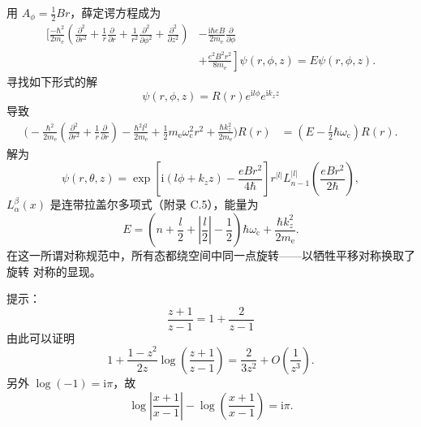  用 $A_{\phi}=\frac{1}{2}Br$，薛定谔方程成为
\begin{align*}
\Bigg[\frac{-\hbar^{2}}{2m_{\mathrm{e}}}\left(\frac{\partial^{2}}{\partial r^{2}}+\frac{1}{r}\frac{\partial}{\partial r}+\frac{1}{r^{2}}\frac{\partial^{2}}{\partial\phi^{2}}+\frac{\partial^{2}}{\partial z^{2}}\right) & - \frac{\mathrm{i}\hbar eB}{2m_{\mathrm{e}}}\frac{\partial}{\partial\phi}\\
& + \left.\frac{e^{2}B^{2}r^{2}}{8m_{\mathrm{e}}}\right]\psi(r,\phi,z) = E\psi(r,\phi,z).\tag{F.95}
\end{align*}
寻找如下形式的解
\begin{equation*}
\psi(r,\phi,z) = R(r)e^{\mathrm{i}l\phi}e^{\mathrm{i}k_z z}\tag{F.96}
\end{equation*}
导致
\begin{align*}
\Bigg(-\frac{\hbar^{2}}{2m_{\mathrm{e}}}\left(\frac{\partial^{2}}{\partial r^{2}}+\frac{1}{r}\frac{\partial}{\partial r}\right) - \frac{\hbar^{2}l^{2}}{2m_{\mathrm{e}}} + \frac{1}{2}m_{\mathrm{e}}\omega_{\mathrm{c}}^{2}r^{2} + \frac{\hbar k_z^{2}}{2m_{\mathrm{e}}}\Bigg)R(r) &= \left(E-\frac{l}{2}\hbar\omega_{\mathrm{c}}\right)R(r).\tag{F.97}
\end{align*}
解为
\begin{equation*}
\psi(r,\theta,z) = \exp\left[\mathrm{i}(l\phi+k_z z)-\frac{eBr^{2}}{4\hbar}\right]r^{|l|}L_{n-1}^{|l|}\left(\frac{eBr^{2}}{2\hbar}\right),\tag{F.98}
\end{equation*}
$L_{\alpha}^{\beta}(x)$ 是连带拉盖尔多项式（附录 C.5），能量为
\begin{equation*}
E = \left(n+\frac{l}{2}+\left|\frac{l}{2}\right|-\frac{1}{2}\right)\hbar\omega_{\mathrm{c}} + \frac{\hbar k_z^{2}}{2m_{\mathrm{e}}}.\tag{F.99}
\end{equation*}
在这一所谓对称规范中，所有态都绕空间中同一点旋转——以牺牲平移对称换取了旋转
对称的显现。

 提示：
\begin{equation*}
\frac{z+1}{z-1} = 1+\frac{2}{z-1}\tag{F.100}
\end{equation*}
由此可以证明
\begin{equation*}
1+\frac{1-z^{2}}{2z}\log\left(\frac{z+1}{z-1}\right) = \frac{2}{3z^{2}}+O\left(\frac{1}{z^{3}}\right).\tag{F.101}
\end{equation*}
另外 $\log(-1)=\mathrm{i}\pi$，故
\begin{equation*}
\log\left|\frac{x+1}{x-1}\right| - \log\left(\frac{x+1}{x-1}\right) = \mathrm{i}\pi.\tag{F.102}
\end{equation*}

